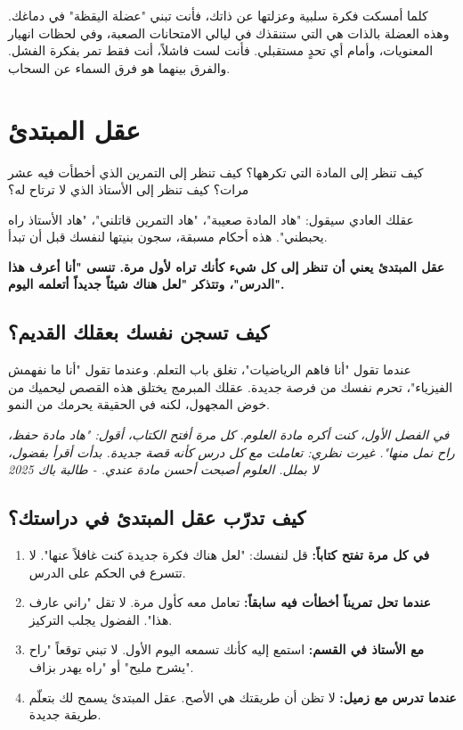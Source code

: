 \documentclass[12pt,a4paper]{book}
\newcommand{\quoteAr}[1]{%
	\begin{myquote}
		\itshape #1
	\end{myquote}
}
\newcommand{\importantAr}[1]{%
	\begin{important}
		\bfseries #1
	\end{important}
}
\begin{document}
	كلما أمسكت فكرة سلبية وعزلتها عن ذاتك، فأنت تبني "عضلة اليقظة" في دماغك. وهذه العضلة بالذات هي التي ستنقذك في ليالي الامتحانات الصعبة، وفي لحظات انهيار المعنويات، وأمام أي تحدٍ مستقبلي. فأنت لست فاشلاً، أنت فقط تمر بفكرة الفشل. والفرق بينهما هو فرق السماء عن السحاب.
	
	
	\section{عقل المبتدئ}
	\label{sec:beginners-mind}
	
	كيف تنظر إلى المادة التي تكرهها؟ كيف تنظر إلى التمرين الذي أخطأت فيه عشر مرات؟ كيف تنظر إلى الأستاذ الذي لا ترتاح له؟
	
	عقلك العادي سيقول: "هاد المادة صعيبة"، "هاد التمرين قاتلني"، "هاد الأستاذ راه يحبطني". هذه أحكام مسبقة، سجون بنيتها لنفسك قبل أن تبدأ.
	
	\importantAr{عقل المبتدئ يعني أن تنظر إلى كل شيء كأنك تراه لأول مرة. تنسى "أنا أعرف هذا الدرس"، وتتذكر "لعل هناك شيئاً جديداً أتعلمه اليوم".}
	
	\subsection{كيف تسجن نفسك بعقلك القديم؟}
	
	عندما تقول "أنا فاهم الرياضيات"، تغلق باب التعلم. وعندما تقول "أنا ما نفهمش الفيزياء"، تحرم نفسك من فرصة جديدة. عقلك المبرمج يختلق هذه القصص ليحميك من خوض المجهول، لكنه في الحقيقة يحرمك من النمو.
	
	\quoteAr{في الفصل الأول، كنت أكره مادة العلوم. كل مرة أفتح الكتاب، أقول: "هاد مادة حفظ، راح نمل منها". غيرت نظري: تعاملت مع كل درس كأنه قصة جديدة. بدأت أقرأ بفضول، لا بملل. العلوم أصبحت أحسن مادة عندي. - طالبة باك 2025}
	
	\subsection{كيف تدرّب عقل المبتدئ في دراستك؟}
	
	\begin{enumerate}
		\item \textbf{في كل مرة تفتح كتاباً:} قل لنفسك: "لعل هناك فكرة جديدة كنت غافلاً عنها". لا تتسرع في الحكم على الدرس.
		\item \textbf{عندما تحل تمريناً أخطأت فيه سابقاً:} تعامل معه كأول مرة. لا تقل "راني عارف هذا". الفضول يجلب التركيز.
		\item \textbf{مع الأستاذ في القسم:} استمع إليه كأنك تسمعه اليوم الأول. لا تبني توقعاً "راح يشرح مليح" أو "راه يهدر بزاف".
		\item \textbf{عندما تدرس مع زميل:} لا تظن أن طريقتك هي الأصح. عقل المبتدئ يسمح لك بتعلّم طريقة جديدة.
	\end{enumerate}
	
\end{document}
